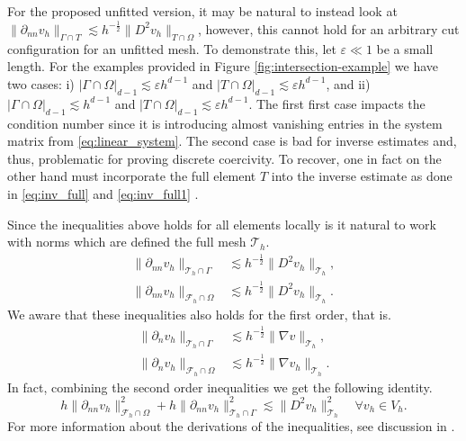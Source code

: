 \documentclass[11pt]{article}
\theoremstyle{remark}
\newcommand{\abs}[1]{\left\lvert #1 \right\rvert}
\numberwithin{equation}{section}
\begin{document}
For the proposed unfitted version, it may be natural to instead look at $\| \partial _{nn} v_{h} \|_{ \Gamma \cap T  }^{  } \lesssim h^{-\frac{1}{2}} \| D^2 v_{h} \|_{ T\cap \Omega  }^{  }$, however, this cannot hold for an arbitrary cut
configuration for an unfitted mesh. To demonstrate this, let $\varepsilon \ll 1$ be a small length. For the examples provided in
    Figure \ref{fig:intersection-example} we have two cases: i) $\abs{ \Gamma \cap \Omega  }_{d-1} \lesssim \varepsilon h^{d-1}  $ and $\abs{ T \cap \Omega  }_{d-1} \lesssim \varepsilon h^{d-1}  $, and ii)
    $\abs{ \Gamma \cap \Omega  }_{d-1} \lesssim  h^{d-1}  $ and $\abs{ T \cap \Omega  }_{d-1} \lesssim \varepsilon h^{d-1}  $.
    The first first case impacts the condition number since it is introducing almost vanishing entries in the system matrix from \eqref{eq:linear_system}.
    The second case is bad for inverse estimates and, thus, problematic for proving discrete coercivity. To recover, one in fact on the other hand must incorporate the full element $T$ into the inverse estimate as done in \eqref{eq:inv_full} and \eqref{eq:inv_full1} .


Since the inequalities above holds for all elements locally is it natural to work with norms which are defined  the full mesh  $\mathcal{T}_{h} $.
\begin{align}
\label{eq:bi_cut_inverse_1}
\| \partial _{nn} v_h \|_{ \mathcal{T} _{h} \cap \Gamma  }^{  } &\lesssim h^{-\frac{1}{2}} \| D^2 v_h \|_{ \mathcal{T}_h }^{  }, \\
\label{eq:bi_cut_inverse_2}
\| \partial _{nn}  v_h \|_{ \mathcal{F}_h \cap \Omega    }^{  }  &  \lesssim   h^{-\frac{1}{2}} \| D^2 v_h \|_{ \mathcal{T}_h  }^{  }.
\end{align}
    We aware that these inequalities also holds for the first order, that is.
\begin{align}
\label{eq:bi_n_cut_inverse_1}
\| \partial _{n} v_h \|_{ \mathcal{T} _{h} \cap \Gamma  }^{  } &\lesssim h^{-\frac{1}{2}} \| \nabla v \|_{ \mathcal{T}_h }^{  }, \\
\label{eq:bi_n_cut_inverse_2}
\| \partial _{n}  v_h \|_{ \mathcal{F}_h \cap \Omega    }^{  }  &  \lesssim   h^{-\frac{1}{2}} \| \nabla v_h \|_{ \mathcal{T}_h  }^{  }.
\end{align}
In fact, combining the second order inequalities we get the following identity.
\begin{equation}
\label{eq:bi_identity}
h\| \partial _{nn}  v_{h} \|_{ \mathcal{F}_h \cap \Omega    }^{2 } + h\| \partial _{nn} v_{h} \|_{ \mathcal{T} _{h} \cap \Gamma  }^{2  } \lesssim \| D^2 v_{h} \|_{ \mathcal{T} _{h}  }^{2  } \quad  \forall v_{h} \in V_{h}.
\end{equation}
For more information about the derivations of the inequalities, see discussion in \cite[Section 2.4]{gurkan2019stabilized}.
\end{document}
